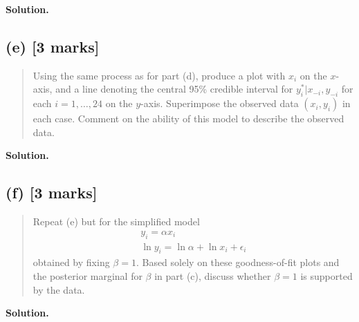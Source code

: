 \documentclass{article}
\newenvironment{question}{\begin{quote}\small}{\end{quote}}
\newcommand{\solution}{\noindent\textbf{Solution.}\ }
\begin{document}
\solution

\subsection*{(e) [3 marks]}

\begin{question}
Using the same process as for part (d), produce a plot with $x_i$ on the $x$-axis, and a line denoting the central 95\% credible interval for $y_i^* | x_{-i}, y_{-i}$ for each $i = 1, \dots, 24$ on the $y$-axis. Superimpose the observed data $(x_i, y_i)$ in each case. Comment on the ability of this model to describe the observed data.
\end{question}

\solution

\subsection*{(f) [3 marks]}

\begin{question}
Repeat (e) but for the simplified model
\begin{gather*}
    y_i = \alpha x_i \\
    \ln y_i = \ln\alpha + \ln x_i + \epsilon_i
\end{gather*}
obtained by fixing $\beta = 1$. Based solely on these goodness-of-fit plots and the posterior marginal for $\beta$ in part (c), discuss whether $\beta = 1$ is supported by the data.
\end{question}

\solution
\end{document}
